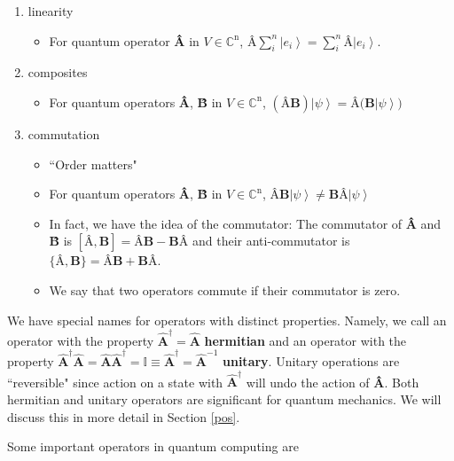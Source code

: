 \documentclass[11pt]{article} %
\newcommand{\ket}[1]{\left|#1\right\rangle}
\begin{document}
\begin{enumerate}
    \item linearity
        \begin{itemize}
            \item For quantum operator \textbf{\^{A}} in $V \in \mathbb{C}^\textrm{n}$, $\textbf{\^{A}}\sum^n_i \ket{e_i} = \sum^n_i \textbf{\^{A}}\ket{e_i}$.
        \end{itemize}
    \item composites
        \begin{itemize}
            \item For quantum operators \textbf{\^{A}}, \textbf{\^{B}} in $V \in \mathbb{C}^\textrm{n}$, $(\textbf{\^{A}\^{B}}) \ket{\psi} = \textbf{\^{A}(\^{B}} \ket{\psi})$
        \end{itemize}
    \item commutation
        \begin{itemize}
            \item ``Order matters"
            \item For quantum operators \textbf{\^{A}}, \textbf{\^{B}} in $V \in \mathbb{C}^\textrm{n}$, $\textbf{\^{A}\^{B}}\ket{\psi} \neq \textbf{\^{B}\^{A}} \ket{\psi}$
            \item In fact, we have the idea of the commutator: The commutator of \textbf{\^{A}} and \textbf{\^{B}} is $[\textbf{\^{A}},\textbf{\^{B}}] = \textbf{\^{A}\^{B}} - \textbf{\^{B}\^{A}}$ and their anti-commutator is $\{\textbf{\^{A}},\textbf{\^{B}}\} = \textbf{\^{A}\^{B}} + \textbf{\^{B}\^{A}}$.
            \item We say that two operators commute if their commutator is zero.
        \end{itemize}
\end{enumerate}

We have special names for operators with distinct properties. Namely, we call an operator with the property $\hat{\textbf{A}}^\dagger = \hat{\textbf{A}}$ \textbf{hermitian} and an operator with the property $\hat{\textbf{A}}^\dagger\hat{\textbf{A}} = \hat{\textbf{A}}\hat{\textbf{A}}^\dagger = \mathbb{I} \equiv \hat{\textbf{A}}^\dagger = \hat{\textbf{A}}^{-1}$ \textbf{unitary}. Unitary operations are ``reversible" since action on a state with $\hat{\textbf{A}}^\dagger$ will undo the action of \textbf{\^{A}}. Both hermitian and unitary operators are significant for quantum mechanics. We will discuss this in more detail in Section \ref{pos}.

Some important operators in quantum computing are 
\end{document}
